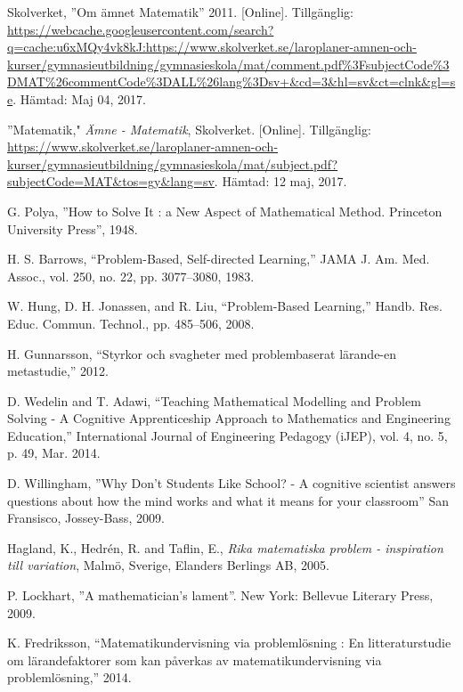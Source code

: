     Skolverket, ''Om ämnet Matematik'' 2011. [Online]. Tillgänglig: \url{https://webcache.googleusercontent.com/search?q=cache:u6xMQy4vk8kJ:https://www.skolverket.se/laroplaner-amnen-och-kurser/gymnasieutbildning/gymnasieskola/mat/comment.pdf\%3FsubjectCode\%3DMAT\%26commentCode\%3DALL\%26lang\%3Dsv+&cd=3&hl=sv&ct=clnk&gl=se}. Hämtad: Maj 04, 2017.
 
    ”Matematik," \textsl{Ämne - Matematik}, Skolverket. [Online]. Tillgänglig: \url{https://www.skolverket.se/laroplaner-amnen-och-kurser/gymnasieutbildning/gymnasieskola/mat/subject.pdf?subjectCode=MAT&tos=gy&lang=sv}. Hämtad: 12 maj, 2017.
    
    G. Polya, ''How to Solve It : a New Aspect of Mathematical Method. Princeton University Press'', 1948.
    
     H. S. Barrows, “Problem-Based, Self-directed Learning,” JAMA J. Am. Med. Assoc., vol. 250, no. 22, pp. 3077–3080, 1983.
      
    W. Hung, D. H. Jonassen, and R. Liu, “Problem-Based Learning,” Handb. Res. Educ. Commun. Technol., pp. 485–506, 2008.
   
    H. Gunnarsson, “Styrkor och svagheter med problembaserat lärande-en metastudie,” 2012.
    
    D. Wedelin and T. Adawi, “Teaching Mathematical Modelling and Problem Solving - A Cognitive Apprenticeship Approach to Mathematics and Engineering Education,” International Journal of Engineering Pedagogy (iJEP), vol. 4, no. 5, p. 49, Mar. 2014.
    
    D. Willingham, ''Why Don't Students Like School? - A cognitive scientist answers questions about how the mind works and what it means for your classroom'' 
    San Fransisco,
    Jossey-Bass, 
    2009.
    
    Hagland, K., Hedrén, R. and Taflin, E., \textit{Rika matematiska problem - inspiration till variation}, Malmö, Sverige, Elanders Berlings AB, 2005.
    
    P. Lockhart, ''A mathematician's lament''. New York: Bellevue Literary Press, 2009.
    
    K. Fredriksson, “Matematikundervisning via problemlösning : En litteraturstudie om lärandefaktorer som kan påverkas av matematikundervisning via problemlösning,” 2014.
    
